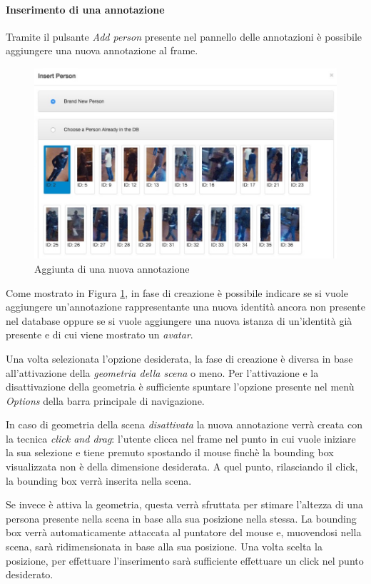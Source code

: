 \paragraph{Inserimento di una annotazione}

Tramite il pulsante \emph{Add person} presente nel pannello delle annotazioni è possibile aggiungere una nuova annotazione al frame. 

\begin{figure}[h]
\centering
\includegraphics[width=0.8\linewidth]{images/add-person.jpg}
  \caption{Aggiunta di una nuova annotazione}
  \label{fig:addperson}
\end{figure}

Come mostrato in Figura \ref{fig:addperson}, in fase di creazione è possibile indicare se si vuole aggiungere un'annotazione rappresentante una nuova identità ancora non presente nel database oppure se si vuole aggiungere una nuova istanza di un'identità già presente e di cui viene mostrato un \emph{avatar}.

Una volta selezionata l'opzione desiderata, la fase di creazione è diversa in base all'attivazione della \emph{geometria della scena} o meno. Per l'attivazione e la disattivazione della geometria è sufficiente spuntare l'opzione presente nel menù \emph{Options} della barra principale di navigazione.

In caso di geometria della scena \emph{disattivata} la nuova annotazione verrà creata con la tecnica \emph{click and drag}: l'utente clicca nel frame nel punto in cui vuole iniziare la sua selezione e tiene premuto spostando il mouse finchè la bounding box visualizzata non è della dimensione desiderata. A quel punto, rilasciando il click, la bounding box verrà inserita nella scena.

Se invece è attiva la geometria, questa verrà sfruttata per stimare l'altezza di una persona presente nella scena in base alla sua posizione nella stessa. La bounding box verrà automaticamente attaccata al puntatore del mouse e, muovendosi nella scena, sarà ridimensionata in base alla sua posizione. Una volta scelta la posizione, per effettuare l'inserimento sarà sufficiente effettuare un click nel punto desiderato. 

